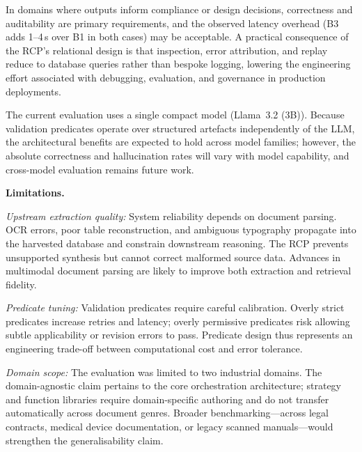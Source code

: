\documentclass[largeformat]{interact}
\begin{document}
In domains where outputs inform compliance or design decisions, correctness and auditability are primary requirements, and the observed latency overhead (B3 adds 1--4\,s over B1 in both cases) may be acceptable. A practical consequence of the RCP's relational design is that inspection, error attribution, and replay reduce to database queries rather than bespoke logging, lowering the engineering effort associated with debugging, evaluation, and governance in production deployments.

The current evaluation uses a single compact model (Llama~3.2 (3B)). Because validation predicates operate over structured artefacts independently of the LLM, the architectural benefits are expected to hold across model families; however, the absolute correctness and hallucination rates will vary with model capability, and cross-model evaluation remains future work.

\vspace{1.0em}
\noindent \textbf{Limitations.}

 \vspace{1.0em}
    \noindent \textit{Upstream extraction quality:} System reliability depends on document parsing. OCR errors, poor table reconstruction, and ambiguous typography propagate into the harvested database and constrain downstream reasoning. The RCP prevents unsupported synthesis but cannot correct malformed source data. Advances in multimodal document parsing are likely to improve both extraction and retrieval fidelity.
\vspace{0.5em}

    \noindent \textit{Predicate tuning:} Validation predicates require careful calibration. Overly strict predicates increase retries and latency; overly permissive predicates risk allowing subtle applicability or revision errors to pass. Predicate design thus represents an engineering trade-off between computational cost and error tolerance.
\vspace{0.5em}

    \noindent \textit{Domain scope:} The evaluation was limited to two industrial domains. The domain-agnostic claim pertains to the core orchestration architecture; strategy and function libraries require domain-specific authoring and do not transfer automatically across document genres. Broader benchmarking---across legal contracts, medical device documentation, or legacy scanned manuals---would strengthen the generalisability claim.
\vspace{0.5em}
\end{document}
